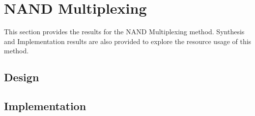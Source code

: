 
\section{NAND Multiplexing}
\label{sec:nand}

This section provides the results for the NAND Multiplexing method. Synthesis and Implementation results are also 
provided to explore the resource usage of this method.

\subsection{Design}
\label{sec:nand-des}

\subsection{Implementation}
\label{sec:nand-impl}

